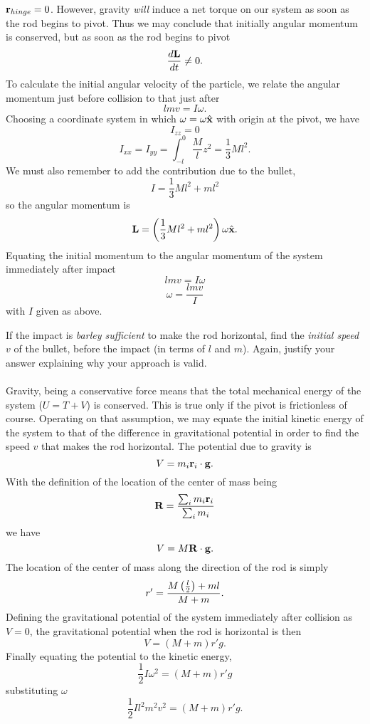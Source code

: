 \documentclass[11pt,letterpaper]{article}
\begin{document}
			$\mathbf{r}_{hinge} = 0$. However, gravity \emph{will} induce a net torque on our system as soon as the rod begins to pivot. Thus we 
			may conclude that initially angular momentum is conserved, but as soon as the rod begins to pivot
			\[
				\frac{d\mathbf{L}}{dt}\ne 0.
			\]
			To calculate the initial angular velocity of the particle, we relate the angular momentum just before collision to that just 
			after
			\[
				lmv = I\omega.
			\]
			Choosing a coordinate system in which $\mathbf{\omega} = \omega\hat{\mathbf{x}}$ with origin at the pivot, we have
			\[
				I_{zz} = 0
			\]
			\[
				I_{xx}=I_{yy}= \int_{-l}^0 \frac{M}{l}z^2 = \frac{1}{3}Ml^2.
			\]
			We must also remember to add the contribution due to the bullet, 
			\[
				I = \frac{1}{3}Ml^2+ml^2
			\]
			so the angular momentum is 
			\[
				\mathbf{L} = \left(\frac{1}{3}Ml^2+ml^2\right)\omega\hat{\mathbf{x}}.
			\]
			Equating the initial momentum to the angular momentum of the system immediately after impact
			\[
				lmv = I\omega
			\]
			\[
				\omega = \frac{lmv}{I}
			\]
			with $I$ given as above. 
			\item
			If the impact is \emph{barley sufficient} to make the rod horizontal, find the \emph{initial speed $v$} of the bullet, 
			before the impact (in terms of $l$ and $m$). Again, justify your answer explaining why your approach is valid.
			\\
			\\
			Gravity, being a conservative force means that the total mechanical energy of the system ($U=T+V$) is conserved. This
			is true only if the pivot is frictionless of course. Operating on that assumption, we may equate the initial kinetic energy of the 
			system to that of the difference in gravitational potential in order to find the speed $v$ that makes the rod horizontal. The 
			potential due to gravity is 
			\[
				V = m_i\mathbf{r}_i\cdot\mathbf{g}.
			\] 
			With the definition of the location of the center of mass being 
			\[
				\mathbf{R} = \frac{\sum_i m_i\mathbf{r}_i}{\sum_i m_i}
			\]
			we have
			\[
				V = M\mathbf{R}\cdot \mathbf{g}.
			\]
			The location of the center of mass along the direction of the rod is simply
			\[	
				r' = \frac{M\left(\frac{l}{2}\right)+ml}{M+m}.
			\]
			Defining the gravitational potential of the system immediately after collision as $V=0$, the gravitational potential 
			when the rod is horizontal is then
			\[
				V = (M+m)r'g.
			\]
			Finally equating the potential to the kinetic energy,
			\[
				\frac{1}{2}I\omega^2 = (M+m)r'g
			\]
			substituting $\omega$
			\[
				\frac{1}{2}Il^2m^2v^2 = (M+m)r'g. 
			\]
\end{document}
